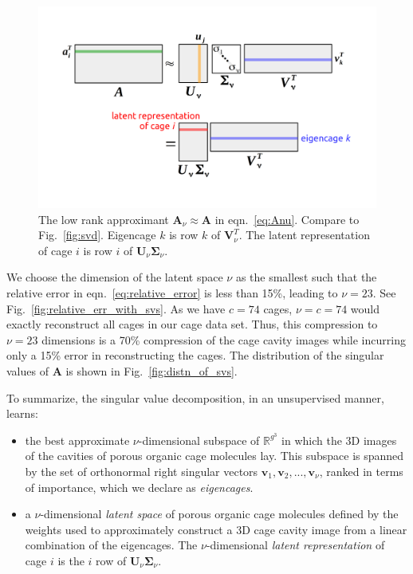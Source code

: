 \documentclass[journal=jacsat,manuscript=article,layout=traditional]{achemso}
\begin{document}
\begin{figure}
\centering
	\includegraphics[width=0.75\columnwidth]{../svd_approx.png}
	\caption{The low rank approximant $\mathbf{A}_\nu \approx \mathbf{A}$ in eqn.~\ref{eq:Anu}. Compare to Fig.~\ref{fig:svd}. Eigencage $k$ is row $k$ of $\mathbf{V}_\nu^T$. The latent representation of cage $i$ is row $i$ of $\mathbf{U}_\nu \mathbf{\Sigma}_\nu$.
	} \label{fig:svd_approx}
\end{figure}

We choose the dimension of the latent space $\nu$ as the smallest such that the relative error in eqn.~\ref{eq:relative_error} is less than 15\%, leading to $\nu=23$. See Fig.~\ref{fig:relative_err_with_svs}. As we have $c=74$ cages, $\nu=c=74$ would exactly reconstruct all cages in our cage data set. Thus, this compression to $\nu=23$ dimensions is a 70\% compression of the cage cavity images while incurring only a 15\% error in reconstructing the cages. The distribution of the singular values of $\mathbf{A}$ is shown in Fig.~\ref{fig:distn_of_svs}.

To summarize, the singular value decomposition, in an unsupervised manner, learns:
\begin{itemize}
\item the best approximate $\nu$-dimensional subspace of $\mathbb{R}^{g^3}$ in which the 3D images of the cavities of porous organic cage molecules lay. This subspace is spanned by the set of orthonormal right singular vectors $\mathbf{v}_1, \mathbf{v}_2, ..., \mathbf{v}_\nu$, ranked in terms of importance, which we declare as \emph{eigencages}.
\item a $\nu$-dimensional \emph{latent space} of porous organic cage molecules defined by the weights used to approximately construct a 3D cage cavity image from a linear combination of the eigencages. The $\nu$-dimensional \emph{latent representation} of cage $i$ is the $i$ row of $\mathbf{U}_\nu \mathbf{\Sigma}_\nu$.
\end{itemize}
\end{document}
